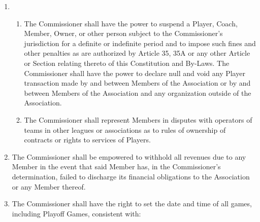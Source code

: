 \documentclass[]{book}
\providecommand{\tightlist}{%
  \setlength{\itemsep}{0pt}\setlength{\parskip}{0pt}}
\begin{document}
\begin{enumerate}
\item
  \begin{enumerate}
  \def\labelenumii{(\roman{enumii})}
  \tightlist
  \item
    The Commissioner shall have the power to suspend a Player, Coach, Member, Owner, or other person subject to the Commissioner's jurisdiction for a definite or indefinite period and to impose such fines and other penalties as are authorized by Article 35, 35A or any other Article or Section relating thereto of this Constitution and By-Laws. The Commissioner shall have the power to declare null and void any Player transaction made by and between Members of the Association or by and between Members of the Association and any organization outside of the Association.
  \item
    The Commissioner shall represent Members in disputes with operators of teams in other leagues or associations as to rules of ownership of contracts or rights to services of Players.
  \end{enumerate}
\item
  The Commissioner shall be empowered to withhold all revenues due to any Member in the event that said Member has, in the Commissioner's determination, failed to discharge its financial obligations to the Association or any Member thereof.
\item
  The Commissioner shall have the right to set the date and time of all games, including Playoff Games, consistent with:


\end{enumerate}
\end{document}
